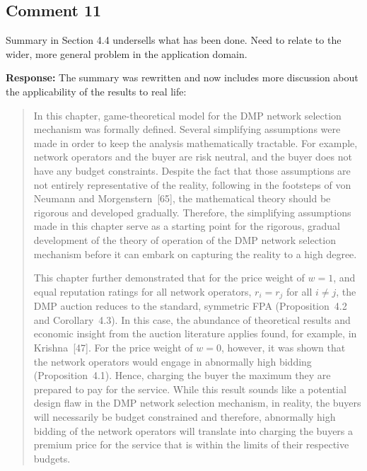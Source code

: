 \documentclass[10pt,a4paper,notitlepage]{article}
\numberwithin{equation}{section}
\begin{document}
\subsection{Comment 11}
Summary in Section 4.4 undersells what has been done. Need to relate to the wider, more general problem in the application domain.

\textbf{Response:}
The summary was rewritten and now includes more discussion about the applicability of the results to real life:
\begin{quote}
In this chapter, game-theoretical model for the DMP network selection mechanism was formally defined. Several simplifying assumptions were made in order to keep the analysis mathematically tractable. For example, network operators and the buyer are risk neutral, and the buyer does not have any budget constraints. Despite the fact that those assumptions are not entirely representative of the reality, following in the footsteps of von Neumann and Morgenstern~[65], the mathematical theory should be rigorous and developed gradually. Therefore, the simplifying assumptions made in this chapter serve as a starting point for the rigorous, gradual development of the theory of operation of the DMP network selection mechanism before it can embark on capturing the reality to a high degree.

This chapter further demonstrated that for the price weight of $w=1$, and equal reputation ratings for all network operators, $r_i=r_j$ for all $i\neq j$, the DMP auction reduces to the standard, symmetric FPA (Proposition~4.2 and Corollary~4.3). In this case, the abundance of theoretical results and economic insight from the auction literature applies found, for example, in Krishna~[47]. For the price weight of $w=0$, however, it was shown that the network operators would engage in abnormally high bidding (Proposition~4.1). Hence, charging the buyer the maximum they are prepared to pay for the service. While this result sounds like a potential design flaw in the DMP network selection mechanism, in reality, the buyers will necessarily be budget constrained and therefore, abnormally high bidding of the network operators will translate into charging the buyers a premium price for the service that is within the limits of their respective budgets.


\end{quote}
\end{document}
